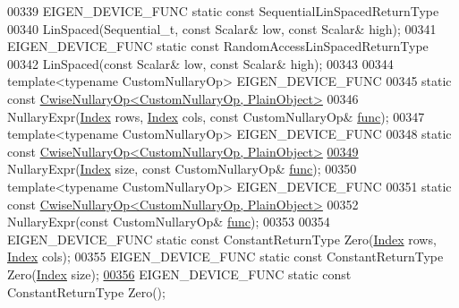 \begin{DoxyCode}
00339     EIGEN\_DEVICE\_FUNC \textcolor{keyword}{static} \textcolor{keyword}{const} SequentialLinSpacedReturnType
00340     LinSpaced(Sequential\_t, \textcolor{keyword}{const} Scalar& low, \textcolor{keyword}{const} Scalar& high);
00341     EIGEN\_DEVICE\_FUNC \textcolor{keyword}{static} \textcolor{keyword}{const} RandomAccessLinSpacedReturnType
00342     LinSpaced(\textcolor{keyword}{const} Scalar& low, \textcolor{keyword}{const} Scalar& high);
00343 
00344     \textcolor{keyword}{template}<\textcolor{keyword}{typename} CustomNullaryOp> EIGEN\_DEVICE\_FUNC
00345     \textcolor{keyword}{static} \textcolor{keyword}{const} \hyperlink{group___core___module_class_eigen_1_1_cwise_nullary_op}{CwiseNullaryOp<CustomNullaryOp, PlainObject>}
00346     NullaryExpr(\hyperlink{namespace_eigen_a62e77e0933482dafde8fe197d9a2cfde}{Index} rows, \hyperlink{namespace_eigen_a62e77e0933482dafde8fe197d9a2cfde}{Index} cols, \textcolor{keyword}{const} CustomNullaryOp& \hyperlink{structfunc}{func});
00347     \textcolor{keyword}{template}<\textcolor{keyword}{typename} CustomNullaryOp> EIGEN\_DEVICE\_FUNC
00348     \textcolor{keyword}{static} \textcolor{keyword}{const} \hyperlink{group___core___module_class_eigen_1_1_cwise_nullary_op}{CwiseNullaryOp<CustomNullaryOp, PlainObject>}
\hyperlink{group___core___module_a3e7f36548fb49d9e9feac8d563af4ccd}{00349}     NullaryExpr(\hyperlink{namespace_eigen_a62e77e0933482dafde8fe197d9a2cfde}{Index} size, \textcolor{keyword}{const} CustomNullaryOp& \hyperlink{structfunc}{func});
00350     \textcolor{keyword}{template}<\textcolor{keyword}{typename} CustomNullaryOp> EIGEN\_DEVICE\_FUNC
00351     \textcolor{keyword}{static} \textcolor{keyword}{const} \hyperlink{group___core___module_class_eigen_1_1_cwise_nullary_op}{CwiseNullaryOp<CustomNullaryOp, PlainObject>}
00352     NullaryExpr(\textcolor{keyword}{const} CustomNullaryOp& \hyperlink{structfunc}{func});
00353 
00354     EIGEN\_DEVICE\_FUNC \textcolor{keyword}{static} \textcolor{keyword}{const} ConstantReturnType Zero(\hyperlink{namespace_eigen_a62e77e0933482dafde8fe197d9a2cfde}{Index} rows, 
      \hyperlink{namespace_eigen_a62e77e0933482dafde8fe197d9a2cfde}{Index} cols);
00355     EIGEN\_DEVICE\_FUNC \textcolor{keyword}{static} \textcolor{keyword}{const} ConstantReturnType Zero(\hyperlink{namespace_eigen_a62e77e0933482dafde8fe197d9a2cfde}{Index} size);
\hyperlink{group___core___module_ac02039681488eb5a6780b7102e01a394}{00356}     EIGEN\_DEVICE\_FUNC \textcolor{keyword}{static} \textcolor{keyword}{const} ConstantReturnType Zero();

\end{DoxyCode}
